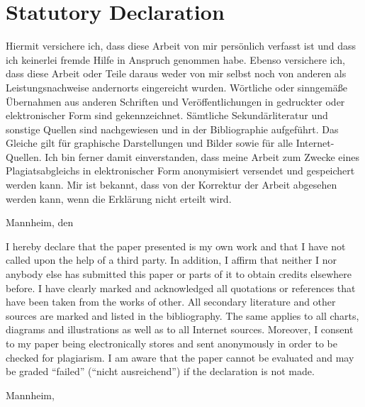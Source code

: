 \documentclass[12pt,english,a4paper,oneside]{article}
\newcommand*{\SignatureAndDate}[1]{%
\vspace{2cm}
     Mannheim, den \makebox[2cm]{\hrulefill} \hfill\makebox[9cm]{\hrulefill}%
     \par
  \hfill\makebox[7.5cm][t]{Name und Unterschrift}
  \vspace{2cm}
}%
\newcommand*{\SignatureAndDateEng}[1]{%
\vspace{2cm}
     Mannheim, \makebox[2cm]{\hrulefill} \hfill\makebox[9cm]{\hrulefill}%
     \par
    \hfill\makebox[7.5cm][t]{Name and Signature}%
\vspace{2cm}
}%
\begin{document}
\clearpage

\hypertarget{statutory-declaration}{%
\section*{Statutory Declaration}\label{statutory-declaration}}

Hiermit versichere ich, dass diese Arbeit von mir persönlich verfasst ist und dass ich keinerlei fremde Hilfe in Anspruch genommen habe.
Ebenso versichere ich, dass diese Arbeit oder Teile daraus weder von mir selbst noch von anderen als Leistungsnachweise andernorts eingereicht wurden.
Wörtliche oder sinngemäße Übernahmen aus anderen Schriften und Veröffentlichungen in gedruckter oder elektronischer Form sind gekennzeichnet.
Sämtliche Sekundärliteratur und sonstige Quellen sind nachgewiesen und in der Bibliographie aufgeführt.
Das Gleiche gilt für graphische Darstellungen und Bilder sowie für alle Internet-Quellen.
Ich bin ferner damit einverstanden, dass meine Arbeit zum Zwecke eines Plagiatsabgleichs in elektronischer Form anonymisiert versendet und gespeichert werden kann.
Mir ist bekannt, dass von der Korrektur der Arbeit abgesehen werden kann, wenn die Erklärung nicht erteilt wird.

\SignatureAndDate{}
\renewcommand*{\thepage}{ }

\noindent I hereby declare that the paper presented is my own work and that I have not called upon the help of a third party.
In addition, I affirm that neither I nor anybody else has submitted this paper or parts of it to obtain credits elsewhere before.
I have clearly marked and acknowledged all quotations or references that have been taken from the works of other.
All secondary literature and other sources are marked and listed in the bibliography.
The same applies to all charts, diagrams and illustrations as well as to all Internet sources.
Moreover, I consent to my paper being electronically stores and sent anonymously in order to be checked for plagiarism.
I am aware that the paper cannot be evaluated and may be graded \enquote{failed} (\enquote{nicht ausreichend}) if the declaration is not made.

\SignatureAndDateEng{}

\end{document}
